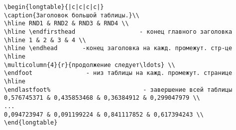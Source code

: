 \documentclass[a4paper,12pt]{article}%
\theoremstyle{plain}%
\theoremstyle{definition}%
\theoremstyle{remark}%
\begin{document}
\begin{verbatim}
\begin{longtable}{|c|c|c|c|}
\caption{Заголовок большой таблицы.}\\
\hline RND1 & RND2 & RND3 & RND4 \\
\hline \endfirsthead                  - конец главного заголовка
\hline 1 & 2 & 3 & 4 \\
\hline \endhead       -конец заголовка на кажд. промежут. стр-це
\hline
\multicolumn{4}{r}{продолжение следует\ldots} \\
\endfoot               - низ таблицы на кажд. промежут. странице
\hline
\endlastfoot%                          - завершение всей таблицы
0,576745371 & 0,435853468 & 0,36384912 & 0,299047979 \\
...
0,094723947 & 0,091199224 & 0,841117852 & 0,617394243 \\
\end{longtable}
\end{verbatim}
\end{document}
